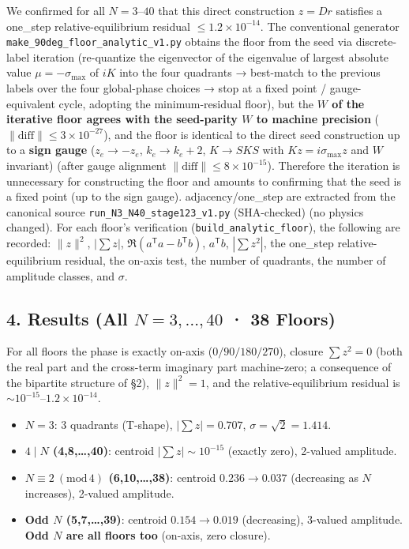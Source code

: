 \documentclass[
  a4paper,
]{ltjsarticle}
\providecommand{\tightlist}{%
  \setlength{\itemsep}{0pt}\setlength{\parskip}{0pt}}
\begin{document}
We confirmed for all \(N=3\)--\(40\) that this direct construction
\(z=Dr\) satisfies a one\_step relative-equilibrium residual
\(\le1.2\times10^{-14}\). The conventional generator
\texttt{make\_90deg\_floor\_analytic\_v1.py} obtains the floor from the
seed via discrete-label iteration (re-quantize the eigenvector of the
eigenvalue of largest absolute value \(\mu=-\sigma_{\max}\) of \(iK\)
into the four quadrants → best-match to the previous labels over the
four global-phase choices → stop at a fixed point / gauge-equivalent
cycle, adopting the minimum-residual floor), but the \textbf{\(W\) of
the iterative floor agrees with the seed-parity \(W\) to machine
precision} (\(\|\text{diff}\|\le3\times10^{-27}\)), and the floor is
identical to the direct seed construction up to a \textbf{sign gauge}
(\(z_e\to-z_e\), \(k_e\to k_e+2\), \(K\to SKS\) with
\(Kz=i\sigma_{\max}z\) and \(W\) invariant) (after gauge alignment
\(\|\text{diff}\|\le8\times10^{-15}\)). Therefore the iteration is
unnecessary for constructing the floor and amounts to confirming that
the seed is a fixed point (up to the sign gauge). adjacency/one\_step
are extracted from the canonical source
\texttt{run\_N3\_N40\_stage123\_v1.py} (SHA-checked) (no physics
changed). For each floor's verification
(\texttt{build\_analytic\_floor}), the following are recorded:
\(\|z\|^2\), \(|\sum z|\), \(\Re(a^{\mathsf T}a-b^{\mathsf T}b)\),
\(a^{\mathsf T}b\), \(|\sum z^2|\), the one\_step relative-equilibrium
residual, the on-axis test, the number of quadrants, the number of
amplitude classes, and \(\sigma\).

\subsection{\texorpdfstring{4. Results (All \(N=3,\ldots,40\) · 38
Floors)}{4. Results (All N=3,\textbackslash ldots,40 · 38 Floors)}}\label{results-all-n3ldots40-38-floors}

For all floors the phase is exactly on-axis (\(0/90/180/270\)), closure
\(\sum z^2=0\) (both the real part and the cross-term imaginary part
machine-zero; a consequence of the bipartite structure of §2),
\(\|z\|^2=1\), and the relative-equilibrium residual is
\(\sim10^{-15}\)--\(1.2\times10^{-14}\).

\begin{itemize}
\tightlist
\item
  \textbf{\(N=3\)}: 3 quadrants (T-shape), \(|\sum z|=0.707\),
  \(\sigma=\sqrt2=1.414\).
\item
  \textbf{\(4\mid N\) (4,8,\ldots,40)}: centroid
  \(|\sum z|\sim10^{-15}\) (exactly zero), 2-valued amplitude.
\item
  \textbf{\(N\equiv2\ (\mathrm{mod}\,4)\) (6,10,\ldots,38)}: centroid
  \(0.236\to0.037\) (decreasing as \(N\) increases), 2-valued amplitude.
\item
  \textbf{Odd \(N\) (5,7,\ldots,39)}: centroid \(0.154\to0.019\)
  (decreasing), 3-valued amplitude. \textbf{Odd \(N\) are all floors
  too} (on-axis, zero closure).
\end{itemize}
\end{document}
